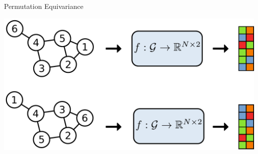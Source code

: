 \documentclass[11pt]{beamer}
\begin{document}
\begin{frame}{Permutation Equivariance}
  \begin{center}
    \includegraphics[width=.8\textwidth]{equivariant}
  \end{center}
\end{frame}
\end{document}
